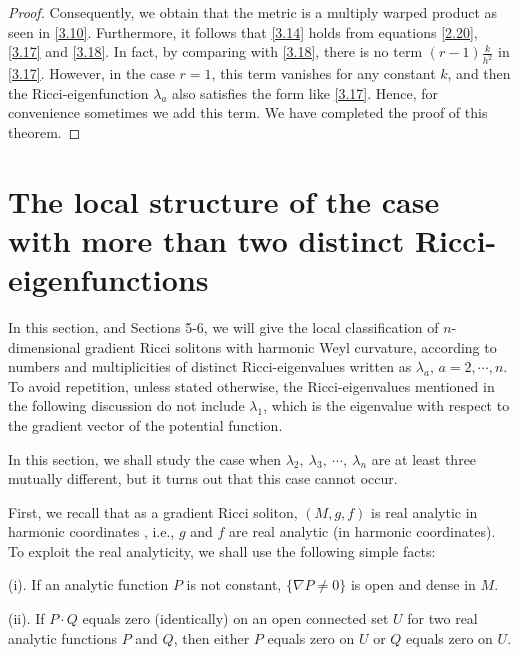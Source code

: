 \documentclass{amsart}
\theoremstyle{definition}
\theoremstyle{remark}
\numberwithin{equation}{section}
\begin{document}
\begin{proof}
   Consequently, we obtain that the metric is a multiply warped product as seen in \eqref{3.10}. 
   Furthermore, it follows that \eqref{3.14} holds from equations \eqref{2.20}, \eqref{3.17} and \eqref{3.18}. 
   In fact, by comparing with \eqref{3.18}, there is no term $( r-1)\frac{k}{h^2}$ in \eqref{3.17}. 
   However, in the case $r=1$, this term vanishes for any constant $k$, and then the Ricci-eigenfunction $\lambda_{a}$ also satisfies the form like \eqref{3.17}.
   Hence, for convenience sometimes we add this term. We have completed the proof of this theorem.
  \end{proof}


	
	\section{The local structure  of the case with more than two distinct Ricci-eigenfunctions}
	In this section, and Sections 5-6, we will give the local classification of $n$-dimensional gradient Ricci solitons with harmonic Weyl curvature, according to numbers and multiplicities of distinct Ricci-eigenvalues written as $\lambda_a$, $a=2,\cdots, n$.
	To avoid repetition, unless stated otherwise, the Ricci-eigenvalues mentioned in the following discussion do not include $\lambda_1$, which is the eigenvalue with respect to the gradient vector of the potential function.

	In this section, we shall study the case when $\lambda_2,~\lambda_3,~\cdots,~\lambda_n$ are at least three mutually different, but it turns out that this case cannot occur.
    
			\smallskip
	First, we recall that as a gradient Ricci soliton, $(M,g,f)$ is real analytic in harmonic coordinates \cite{Iv}, i.e., $g$ and $f$ are real analytic (in harmonic coordinates).
	To exploit the real analyticity, we shall use the following simple facts:
	
	{\rm (i).} 
	If an analytic function $P$ is not constant, $\{ \nabla P \neq 0  \}$ is open and dense in $M$. 
	
	{\rm (ii).} 
	If $P \cdot Q$ equals zero (identically) on an open connected set $U$ for two real analytic functions $P$ and $Q$, 
	then either $P$ equals zero on $U$ or $Q$ equals zero on $U$.
	
\end{document}
